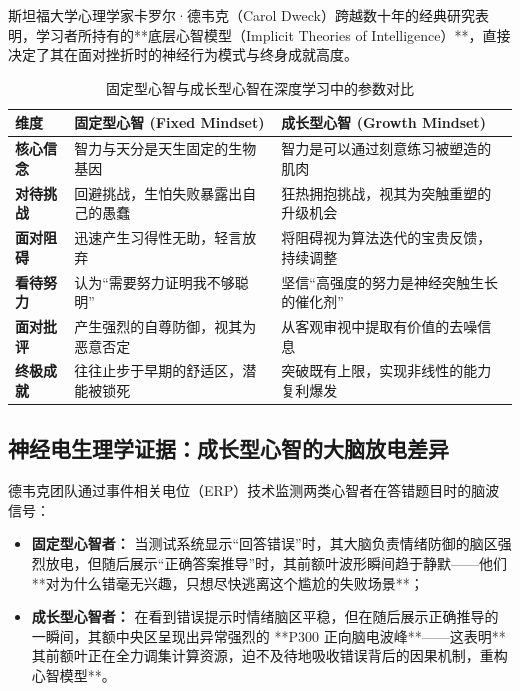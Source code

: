 \documentclass[12pt,a4paper,openany]{ctexbook}
\begin{document}
斯坦福大学心理学家卡罗尔·德韦克（Carol Dweck）跨越数十年的经典研究表明，学习者所持有的**底层心智模型（Implicit Theories of Intelligence）**，直接决定了其在面对挫折时的神经行为模式与终身成就高度。

\begin{table}[H]
\centering
\small
\begin{tabular}{@{}lll@{}}
\toprule
\textbf{维度} & \textbf{固定型心智 (Fixed Mindset)} & \textbf{成长型心智 (Growth Mindset)} \\ \midrule
\textbf{核心信念} & 智力与天分是天生固定的生物基因 & 智力是可以通过刻意练习被塑造的肌肉 \\
\textbf{对待挑战} & 回避挑战，生怕失败暴露出自己的愚蠢 & 狂热拥抱挑战，视其为突触重塑的升级机会 \\
\textbf{面对阻碍} & 迅速产生习得性无助，轻言放弃 & 将阻碍视为算法迭代的宝贵反馈，持续调整 \\
\textbf{看待努力} & 认为“需要努力证明我不够聪明” & 坚信“高强度的努力是神经突触生长的催化剂” \\
\textbf{面对批评} & 产生强烈的自尊防御，视其为恶意否定 & 从客观审视中提取有价值的去噪信息 \\
\textbf{终极成就} & 往往止步于早期的舒适区，潜能被锁死 & 突破既有上限，实现非线性的能力复利爆发 \\ \bottomrule
\end{tabular}
\caption{固定型心智与成长型心智在深度学习中的参数对比}
\end{table}

\subsection*{神经电生理学证据：成长型心智的大脑放电差异}

德韦克团队通过事件相关电位（ERP）技术监测两类心智者在答错题目时的脑波信号：
\begin{itemize}
    \item \textbf{固定型心智者：} 当测试系统显示“回答错误”时，其大脑负责情绪防御的脑区强烈放电，但随后展示“正确答案推导”时，其前额叶波形瞬间趋于静默——他们**对为什么错毫无兴趣，只想尽快逃离这个尴尬的失败场景**；
    \item \textbf{成长型心智者：} 在看到错误提示时情绪脑区平稳，但在随后展示正确推导的一瞬间，其额中央区呈现出异常强烈的 **P300 正向脑电波峰**——这表明**其前额叶正在全力调集计算资源，迫不及待地吸收错误背后的因果机制，重构心智模型**。
\end{itemize}
\end{document}
